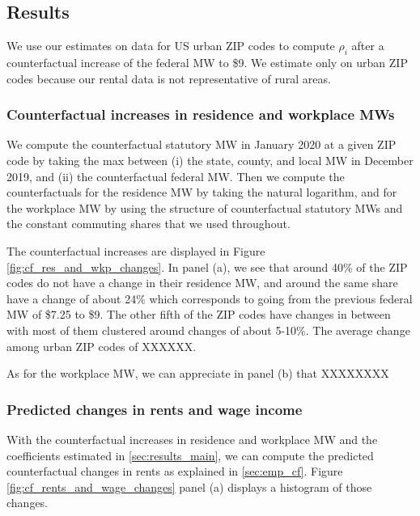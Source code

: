 \subsection{Results}

We use our estimates on data for US urban ZIP codes to compute $\rho_i$ after a 
counterfactual increase of the federal MW to \$9. We estimate only on urban ZIP codes
because our rental data is not representative of rural areas.

\subsubsection{Counterfactual increases in residence and workplace MWs}\label{sec:cf_res_and_wkp_changes}

We compute the counterfactual statutory MW in January 2020 at a given ZIP code by taking 
the max between (i) the state, county, and local MW in December 2019, and (ii) the 
counterfactual federal MW. Then we compute the counterfactuals for the residence MW by 
taking the natural logarithm, and for the workplace MW by using the structure of 
counterfactual statutory MWs and the constant commuting shares that we used throughout.

The counterfactual increases are displayed in Figure \ref{fig:cf_res_and_wkp_changes}. 
In panel (a), we see that around 40\% of the ZIP codes do not have a change in their 
residence MW, and around the same share have a change of about 24\% which corresponds 
to going from the previous federal MW of \$7.25 to \$9. The other fifth of the ZIP 
codes have changes in between with most of them clustered around changes of about 
5-10\%. The average change among urban ZIP codes of XXXXXX.


As for the workplace MW, we can appreciate in panel (b) that XXXXXXXX


\subsubsection{Predicted changes in rents and wage income}\label{sec:cf_rents_and_wage_changes}

With the counterfactual increases in residence and workplace MW and the 
coefficients estimated in \ref{sec:results_main}, we can compute the predicted 
counterfactual changes in rents as explained in \ref{sec:emp_cf}. Figure 
\ref{fig:cf_rents_and_wage_changes} panel (a) displays a histogram of those 
changes. 

